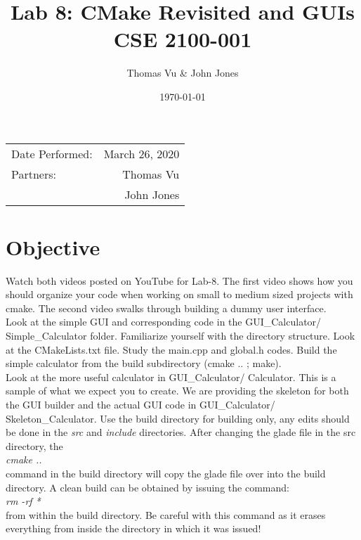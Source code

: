 \documentclass{article}
\title{Lab 8: CMake Revisited and GUIs \\ CSE 2100-001} %
\author{Thomas Vu & John Jones} %
\date{\today} %
\begin{document}
\maketitle %

\begin{center}
\begin{tabular}{l r}
Date Performed: & March 26, 2020 \\ %
Partners: & Thomas Vu \\ %
& John Jones \\
\end{tabular}
\end{center}



\section{Objective}

Watch both videos posted on YouTube for Lab-8. The first video shows how you should organize your code when working on small to medium sized projects with cmake. The second video swalks through building a dummy user interface.\\

Look at the simple GUI and corresponding code in the GUI\_Calculator/ Simple\_Calculator folder.
Familiarize yourself with the directory structure. Look at the CMakeLists.txt file. Study the main.cpp and global.h codes. Build the simple calculator from the build subdirectory (cmake .. ; make).\\

Look at the more useful calculator in GUI\_Calculator/ Calculator. This is a sample of what we expect you to create. We are providing the skeleton for both the GUI builder and the actual GUI code in GUI\_Calculator/ Skeleton\_Calculator. Use the build directory for building only, any edits should be done in the \textit{src} and \textit{include} directories. After changing the glade file in the src directory, the\\ \textit{cmake ..} \\command in the build directory will copy the glade file over into the build directory. A clean build can be obtained by issuing the command:\\ \textit{rm -rf *} \\from within the build directory. Be careful with this command as it erases everything from inside the directory in which it was issued! \\
\end{document}
